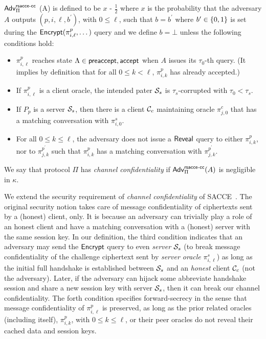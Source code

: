 \begin{definition} \label{def:rsacce-cc}
 $\mathsf{Adv}^{\mathsf{rsacce\textsc{-} cc}}_{\Pi}$ (A) is defined to be $x$ - $\frac{1}{2}$ where $x$ is the probability that the adversary $A$ outputs $(p, i, \ell, b^{\prime})$, with $0\leq \ell$,
 such that $b = b^{\prime}$ where $b^{\prime} \in \{0,1\}$ is set during the $\mathsf{Encrypt}(\pi^p_{i,\ell},\dots)$ query and we define $b=\bot$ unless the following conditions hold:
 \begin{itemize}
  \item{$\pi^p_{i,\ell}$ reaches state $\Lambda \in {\ensuremath{\mathsf{preaccept}}, \ensuremath{\mathsf{accept}}}$ when $A$ issues
  its $\tau_0$-th query. (It implies by definition that for all $0\leq k < \ell$,
  $\pi^p_{i,k}$ has already accepted.)}

  \item{If $\pi^p_{i,\ell}$ is a client oracle,
  the intended pater $\mathcal{S}_s$ is $\tau_s$-corrupted with $\tau_0 < \tau_s$. }

  \item{If $P_p$ is a server $\mathcal{S}_s$, then there is a client $\mathcal{C}_c$ maintaining oracle $\pi^c_{j,0}$ that has a matching conversation with $\pi^s_{i,0}$.}

  \item{For all $0\leq k \leq \ell$, the adversary does not issue a $\mathsf{Reveal}$ query to
  either $\pi^p_{i,k}$, nor to $\pi^{p^{\prime}}_{j,k}$ such that $\pi^p_{i,k}$ has a matching conversation
  with $\pi^{p^{\prime}}_{j,k}$.}
 \end{itemize}
 We say that protocol $\Pi$ has \textit{channel confidentiality}
 if $\mathsf{Adv}^{\mathsf{rsacce\textsc{-} cc}}_{\Pi}(A)$ is negligible in $\kappa$.
\end{definition}

\begin{remark}
We extend the security requirement of \textit{channel confidentiality} of SACCE~\cite{KPW13:SACCE}.
The original security notion takes care of message confidentiality of ciphertexts sent by a (honest) client, only. It is because an adversary can trivially play a role of an honest client and
have a matching conversation with a (honest) server with the same session key. In our definition, the third condition indicates that an adversary may send the $\mathsf{Encrypt}$ query to even \textit{server} $\mathcal{S}_s$ (to break message confidentiality of the challenge ciphertext sent by \textit{server oracle} $\pi^s_{i,\ell}$) as long as the initial full handshake is established between
$\mathcal{S}_s$ and an \textit{honest} client $\mathcal{C}_c$ (not the adversary). Later, if the adversary can hijack some abbreviate handshake session and share a new session key with server $\mathcal{S}_s$, then it can break our channel confidentiality.
The forth condition specifies forward-secrecy in the sense that message confidentiality of $\pi^p_{i,\ell}$ is preserved, as long as the prior related oracles (including itself), $\pi^p_{i,k}$, with $0\leq k\leq \ell$, or their peer oracles do not reveal their cached data and session keys.
\end{remark}

